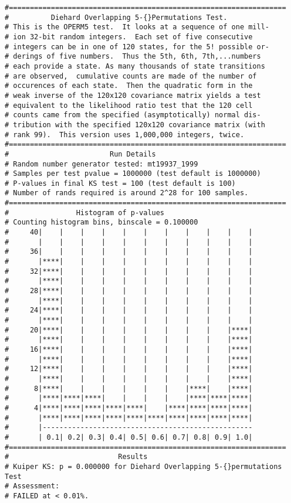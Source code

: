 \documentclass{book}
\begin{document}
\begin{verbatim}
#==================================================================
#          Diehard Overlapping 5-{}Permutations Test.
# This is the OPERM5 test.  It looks at a sequence of one mill- 
# ion 32-bit random integers.  Each set of five consecutive     
# integers can be in one of 120 states, for the 5! possible or- 
# derings of five numbers.  Thus the 5th, 6th, 7th,...numbers   
# each provide a state. As many thousands of state transitions  
# are observed,  cumulative counts are made of the number of    
# occurences of each state.  Then the quadratic form in the     
# weak inverse of the 120x120 covariance matrix yields a test   
# equivalent to the likelihood ratio test that the 120 cell     
# counts came from the specified (asymptotically) normal dis-   
# tribution with the specified 120x120 covariance matrix (with  
# rank 99).  This version uses 1,000,000 integers, twice.       
#==================================================================
#                        Run Details
# Random number generator tested: mt19937_1999
# Samples per test pvalue = 1000000 (test default is 1000000)
# P-values in final KS test = 100 (test default is 100)
# Number of rands required is around 2^28 for 100 samples.
#==================================================================
#                Histogram of p-values
# Counting histogram bins, binscale = 0.100000
#     40|    |    |    |    |    |    |    |    |    |    |
#       |    |    |    |    |    |    |    |    |    |    |
#     36|    |    |    |    |    |    |    |    |    |    |
#       |****|    |    |    |    |    |    |    |    |    |
#     32|****|    |    |    |    |    |    |    |    |    |
#       |****|    |    |    |    |    |    |    |    |    |
#     28|****|    |    |    |    |    |    |    |    |    |
#       |****|    |    |    |    |    |    |    |    |    |
#     24|****|    |    |    |    |    |    |    |    |    |
#       |****|    |    |    |    |    |    |    |    |    |
#     20|****|    |    |    |    |    |    |    |    |****|
#       |****|    |    |    |    |    |    |    |    |****|
#     16|****|    |    |    |    |    |    |    |    |****|
#       |****|    |    |    |    |    |    |    |    |****|
#     12|****|    |    |    |    |    |    |    |    |****|
#       |****|    |    |    |    |    |    |    |    |****|
#      8|****|    |    |    |    |    |    |****|    |****|
#       |****|****|****|    |    |    |    |****|****|****|
#      4|****|****|****|****|****|    |****|****|****|****|
#       |****|****|****|****|****|****|****|****|****|****|
#       |--------------------------------------------------
#       | 0.1| 0.2| 0.3| 0.4| 0.5| 0.6| 0.7| 0.8| 0.9| 1.0|
#==================================================================
#                          Results
# Kuiper KS: p = 0.000000 for Diehard Overlapping 5-{}permutations Test
# Assessment:
# FAILED at < 0.01%.


\end{verbatim}
\end{document}

